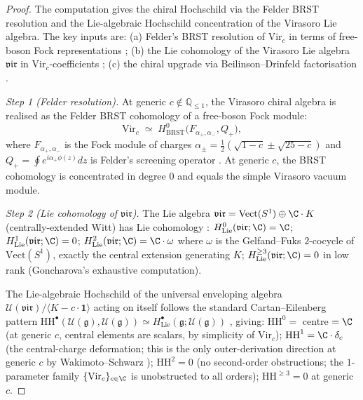 \begin{proof}
The computation gives the chiral Hochschild via the Felder BRST resolution and
the Lie-algebraic Hochschild concentration of the Virasoro Lie
algebra. The key inputs are: (a) Felder's BRST resolution of
$\mathrm{Vir}_c$ in terms of free-boson Fock representations
\cite{Felder1989}; (b) the Lie cohomology of the Virasoro Lie
algebra $\mathfrak{vir}$ in $\mathrm{Vir}_c$-coefficients
\cite{FuksGelfand1980,Goncharova1973}; (c) the chiral upgrade via
Beilinson--Drinfeld factorisation \cite[\S 3.4]{BD04}.

\emph{Step 1 \textup(Felder resolution\textup).}
At generic $c \notin \mathbb{Q}_{\le 1}$, the Virasoro chiral
algebra is realised as the Felder BRST cohomology of a free-boson
Fock module:
\[
\mathrm{Vir}_c \;\simeq\; H^0_{\mathrm{BRST}}\bigl(F_{\alpha_+, \alpha_-}, Q_+\bigr),
\]
where $F_{\alpha_+, \alpha_-}$ is the Fock module of charges
$\alpha_\pm = \tfrac{1}{2}(\sqrt{1 - c} \pm \sqrt{25 - c})$ and
$Q_+ = \oint e^{i \alpha_+ \phi(z)} dz$ is Felder's screening
operator \cite[\S 4]{Felder1989}. At generic $c$, the BRST
cohomology is concentrated in degree $0$ and equals the simple
Virasoro vacuum module.

\emph{Step 2 \textup(Lie cohomology of $\mathfrak{vir}$\textup).}
The Lie algebra $\mathfrak{vir} = \mathrm{Vect}(S^1) \oplus \C \cdot K$
\textup(centrally-extended Witt\textup) has Lie cohomology
\cite{FuksGelfand1980,Goncharova1973}:
$H^0_{\mathrm{Lie}}(\mathfrak{vir}; \C) = \C$;
$H^1_{\mathrm{Lie}}(\mathfrak{vir}; \C) = 0$;
$H^2_{\mathrm{Lie}}(\mathfrak{vir}; \C) = \C \cdot \omega$
where $\omega$ is the Gelfand--Fuks $2$-cocycle of $\mathrm{Vect}(S^1)$,
exactly the central extension generating $K$;
$H^{\ge 3}_{\mathrm{Lie}}(\mathfrak{vir}; \C) = 0$ in low rank
\textup(Goncharova's exhaustive computation\textup).

The Lie-algebraic Hochschild of the universal enveloping algebra
$\mathcal{U}(\mathfrak{vir})/\langle K - c \cdot \mathbf{1}\rangle$
acting on itself follows the standard Cartan--Eilenberg pattern
$\mathrm{HH}^\bullet(\mathcal{U}(\mathfrak{g}), \mathcal{U}(\mathfrak{g}))
\simeq H^\bullet_{\mathrm{Lie}}(\mathfrak{g}; \mathcal{U}(\mathfrak{g}))$
\cite[\S 7]{LQ84}, giving:
$\mathrm{HH}^0 = $ centre $= \C$ \textup(at generic $c$, central
elements are scalars, by simplicity of $\mathrm{Vir}_c$\textup);
$\mathrm{HH}^1 = \C \cdot \delta_c$ \textup(the central-charge
deformation; this is the only outer-derivation direction at
generic $c$ by Wakimoto--Schwarz \cite{Wakimoto1986}\textup);
$\mathrm{HH}^2 = 0$ \textup(no second-order obstructions; the
$1$-parameter family $\{\mathrm{Vir}_c\}_{c \in \C}$ is unobstructed
to all orders\textup);
$\mathrm{HH}^{\ge 3} = 0$ at generic $c$.


\end{proof}
